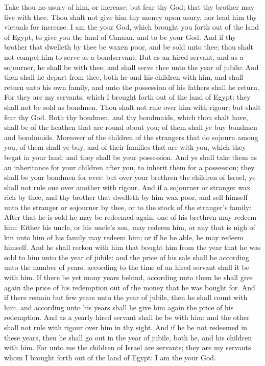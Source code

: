 \begin{biblechapter}
\verse Take thou no usury of him, or increase: but fear thy God; that thy brother may live with thee.
\verse Thou shalt not give him thy money upon usury, nor lend him thy victuals for increase.
\verse I am the \LORD your God, which brought you forth out of the land of Egypt, to give you the land of Canaan, and to be your God.
\verse And if thy brother that dwelleth by thee be waxen poor, and be sold unto thee; thou shalt not compel him to serve as a bondservant:
\verse But as an hired servant, and as a sojourner, he shall be with thee, and shall serve thee unto the year of jubile:
\verse And then shall he depart from thee, both he and his children with him, and shall return unto his own family, and unto the possession of his fathers shall he return.
\verse For they are my servants, which I brought forth out of the land of Egypt: they shall not be sold as bondmen.
\verse Thou shalt not rule over him with rigour; but shalt fear thy God.
\verse Both thy bondmen, and thy bondmaids, which thou shalt have, shall be of the heathen that are round about you; of them shall ye buy bondmen and bondmaids.
\verse Moreover of the children of the strangers that do sojourn among you, of them shall ye buy, and of their families that are with you, which they begat in your land: and they shall be your possession.
\verse And ye shall take them as an inheritance for your children after you, to inherit them for a possession; they shall be your bondmen for ever: but over your brethren the children of Israel, ye shall not rule one over another with rigour.
\verse And if a sojourner or stranger wax rich by thee, and thy brother that dwelleth by him wax poor, and sell himself unto the stranger or sojourner by thee, or to the stock of the stranger's family:
\verse After that he is sold he may be redeemed again; one of his brethren may redeem him:
\verse Either his uncle, or his uncle's son, may redeem him, or any that is nigh of kin unto him of his family may redeem him; or if he be able, he may redeem himself.
\verse And he shall reckon with him that bought him from the year that he was sold to him unto the year of jubile: and the price of his sale shall be according unto the number of years, according to the time of an hired servant shall it be with him.
\verse If there be yet many years behind, according unto them he shall give again the price of his redemption out of the money that he was bought for.
\verse And if there remain but few years unto the year of jubile, then he shall count with him, and according unto his years shall he give him again the price of his redemption.
\verse And as a yearly hired servant shall he be with him: and the other shall not rule with rigour over him in thy sight.
\verse And if he be not redeemed in these years, then he shall go out in the year of jubile, both he, and his children with him.
\verse For unto me the children of Israel are servants; they are my servants whom I brought forth out of the land of Egypt: I am the \LORD your God.
\end{biblechapter}

